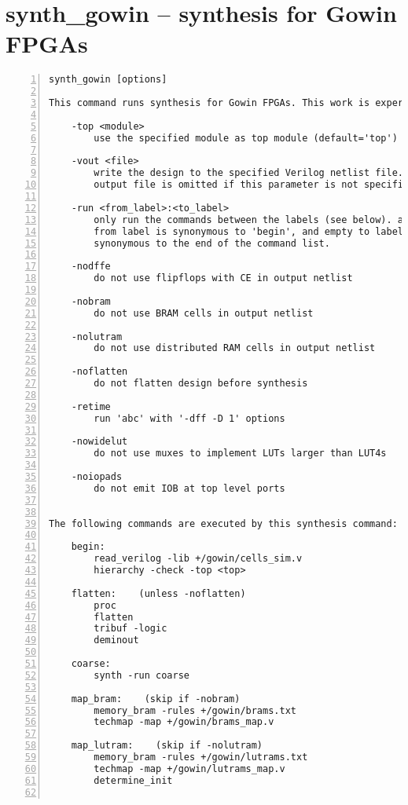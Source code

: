\section{synth\_gowin -- synthesis for Gowin FPGAs}
\label{cmd:synth_gowin}
\begin{lstlisting}[numbers=left,frame=single]
    synth_gowin [options]

This command runs synthesis for Gowin FPGAs. This work is experimental.

    -top <module>
        use the specified module as top module (default='top')

    -vout <file>
        write the design to the specified Verilog netlist file. writing of an
        output file is omitted if this parameter is not specified.

    -run <from_label>:<to_label>
        only run the commands between the labels (see below). an empty
        from label is synonymous to 'begin', and empty to label is
        synonymous to the end of the command list.

    -nodffe
        do not use flipflops with CE in output netlist

    -nobram
        do not use BRAM cells in output netlist

    -nolutram
        do not use distributed RAM cells in output netlist

    -noflatten
        do not flatten design before synthesis

    -retime
        run 'abc' with '-dff -D 1' options

    -nowidelut
        do not use muxes to implement LUTs larger than LUT4s

    -noiopads
        do not emit IOB at top level ports


The following commands are executed by this synthesis command:

    begin:
        read_verilog -lib +/gowin/cells_sim.v
        hierarchy -check -top <top>

    flatten:    (unless -noflatten)
        proc
        flatten
        tribuf -logic
        deminout

    coarse:
        synth -run coarse

    map_bram:    (skip if -nobram)
        memory_bram -rules +/gowin/brams.txt
        techmap -map +/gowin/brams_map.v

    map_lutram:    (skip if -nolutram)
        memory_bram -rules +/gowin/lutrams.txt
        techmap -map +/gowin/lutrams_map.v
        determine_init


\end{lstlisting}
